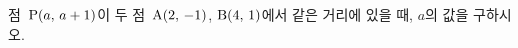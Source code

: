 점~$\mathrm{P}(a,\mkern3mu a+1)$이 두 점~$\mathrm{A}(2,\mkern3mu -1)$, $\mathrm{B}(4,\mkern3mu 1)$에서 같은 거리에 있을 때, $a$의 값을 구하시오.

